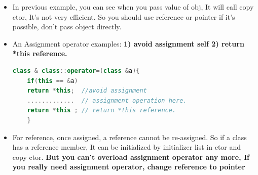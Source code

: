 \documentclass[a4paper,12pt,twoside]{book}
\begin{document}
\begin{itemize}
	\item In previous example, you can see when you pass  value of obj, It will call copy ctor, It's not very efficient. So you should use reference or pointer if it's possible, don't pass object directly.
	
	
	\item An Assignment operator examples: \textbf{1) avoid assignment self 2) return *this reference. }
	\begin{lstlisting}[frame=single, language=c++]
	class & class::operator=(class &a){
	if(this == &a)
	return *this;  //avoid assignment
	.............  // assignment operation here.
	return *this ; // return *this reference.
	}
	\end{lstlisting}
	
	\item For reference, once assigned, a reference cannot be re-assigned. So if a class has a reference member, It can be initialized by initializer list in ctor and copy ctor. \textbf{But you can't overload assignment operator any more, If you really need assignment operator, change reference to pointer}
	
\end{itemize}
\end{document}
